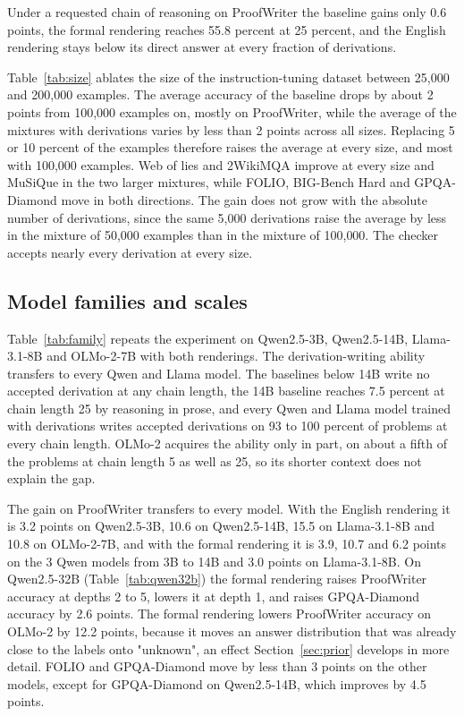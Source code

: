 \documentclass{article}
\begin{document}
Under a requested chain of reasoning on ProofWriter the baseline gains only
0.6 points, the formal rendering reaches 55.8 percent at 25 percent, and the
English rendering stays below its direct answer at every fraction of derivations.


Table~\ref{tab:size} ablates the size of the instruction-tuning dataset
between 25{,}000 and 200{,}000 examples. The average accuracy of the baseline
drops by about 2 points from 100{,}000 examples on, mostly on ProofWriter,
while the average of the mixtures with derivations varies by less than 2 points
across all sizes. Replacing 5 or 10 percent of the examples therefore raises
the average at every size, and most with 100{,}000 examples. Web of lies and
2WikiMQA improve at every size and MuSiQue in the two larger mixtures, while
FOLIO, BIG-Bench Hard and GPQA-Diamond move in both directions. The gain does
not grow with the absolute number of derivations, since the same 5{,}000
derivations raise the average by less in the mixture of 50{,}000 examples than
in the mixture of 100{,}000. The checker accepts nearly every derivation at
every size.

\subsection{Model families and scales}
\label{sec:families}


Table~\ref{tab:family} repeats the experiment on Qwen2.5-3B, Qwen2.5-14B,
Llama-3.1-8B and OLMo-2-7B with both renderings. The
derivation-writing ability transfers to every Qwen and Llama model. The
baselines below 14B write no accepted derivation at any chain length, the
14B baseline reaches 7.5 percent at chain length 25 by reasoning in prose,
and every Qwen and Llama model trained with derivations writes accepted
derivations on 93 to 100 percent of problems at every chain length. OLMo-2 acquires the ability only in part, on about a
fifth of the problems at chain length 5 as well as 25, so its shorter
context does not explain the gap.


The gain on ProofWriter transfers to every model. With the English rendering
it is 3.2 points on Qwen2.5-3B, 10.6 on Qwen2.5-14B, 15.5 on Llama-3.1-8B
and 10.8 on OLMo-2-7B, and with the formal rendering it is 3.9, 10.7 and
6.2 points on the 3 Qwen models from 3B to 14B and 3.0 points on
Llama-3.1-8B. On Qwen2.5-32B (Table~\ref{tab:qwen32b}) the formal rendering
raises ProofWriter accuracy at depths 2 to 5, lowers it at depth 1, and
raises GPQA-Diamond accuracy by 2.6 points. The
formal rendering lowers ProofWriter accuracy on OLMo-2 by 12.2 points,
because it moves an answer distribution that was already close to the labels
onto "unknown", an effect Section~\ref{sec:prior} develops in more detail.
FOLIO and GPQA-Diamond move by less than 3 points on the other models,
except for GPQA-Diamond on Qwen2.5-14B, which improves by 4.5 points.
\end{document}
